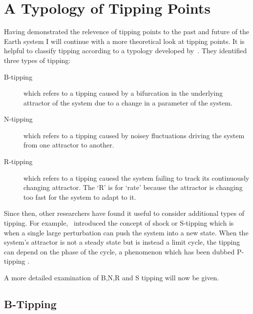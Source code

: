 \section{A Typology of Tipping Points}
\label{sec:tipping_typology}
Having demonstrated the relevence of tipping points to the past and future of the Earth system I will continue with a more theoretical look at tipping points. It is helpful
to classify tipping according to a typology developed by~\cite{Ashwin2012}. They identified three types of tipping:
\begin{description}
\item[B-tipping] which refers to a tipping caused by a bifurcation in the underlying attractor of the system due to a change in a parameter of the system.
\item[N-tipping] which refers to a tipping caused by noisey fluctuations driving the system  from one attractor to another.
\item[R-tipping] which  refers to a tipping cauesd the system failing to track its continuously changing attractor. The `R' is for `rate' because the attractor is changing too
  fast for the system to adapt to it.
\end{description}

Since then, other researchers have found it useful to consider additional types of tipping. For example,~\cite{Halekotte2020} introduced the concept of shock or S-tipping which is when a single large perturbation
can push the system into a new state. When the system's attractor is not a steady state but is instead a limit cycle, the tipping can depend on the phase of the cycle, a phenomenon which has
been dubbed P-tipping \parencite{Alkhayuon2021}. 

A more detailed examination of B,N,R and S tipping will now be given.

\subsection{B-Tipping}
